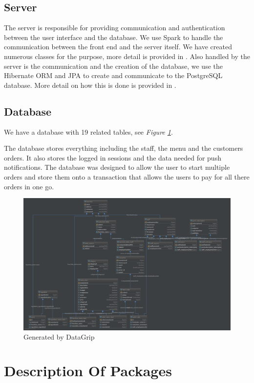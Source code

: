 \documentclass[12pt, twoside, a4paper]{report}
\begin{document}
\section*{Server}
The server is responsible for providing communication and authentication between the user interface and the database.
We use Spark to handle the communication between the front end and the server itself. We have created numerous classes for the purpose, more detail is provided in \textit{}.
Also handled by the server is the communication and the creation of the database, we use the Hibernate ORM and JPA to create and communicate to the PostgreSQL database. More detail on how this is done is provided in \textit{}.

\section*{Database}

We have a database with 19 related tables, see \textit{Figure \ref{fig:data}}. 

The database stores everything including the staff, the menu and the customers orders. 
It also stores the logged in sessions and the data needed for push notifications.
The database was designed to allow the user to start multiple orders and store them onto a transaction that allows the users to pay for all there orders in one go.

\begin{figure}[H]
  \centering
  \includegraphics[width=15cm]{database.png}
  \caption{Generated by DataGrip}
  \label{fig:data}
\end{figure}

\chapter*{Description Of Packages}
\end{document}
